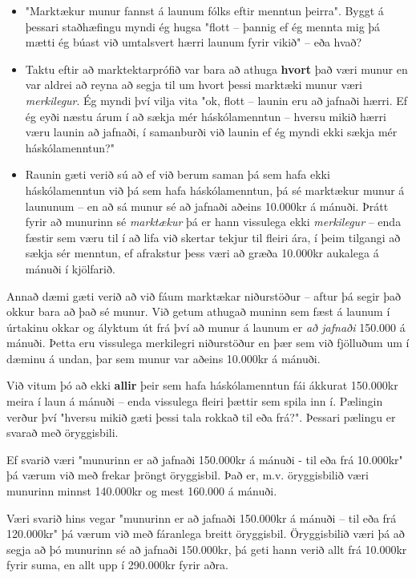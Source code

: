 \documentclass[
]{book}
\theoremstyle{definition}
\theoremstyle{definition}
\theoremstyle{definition}
\theoremstyle{definition}
\theoremstyle{remark}
\begin{document}
\begin{itemize}
\item
  "Marktækur munur fannst á launum fólks eftir menntun þeirra". Byggt á þessari staðhæfingu myndi ég hugsa "flott -- þannig ef ég mennta mig þá mætti ég búast við umtalsvert hærri launum fyrir vikið" -- eða hvað?
\item
  Taktu eftir að marktektarprófið var bara að athuga \textbf{hvort} það væri munur en var aldrei að reyna að segja til um hvort þessi marktæki munur væri \emph{merkilegur}. Ég myndi því vilja vita "ok, flott -- launin eru að jafnaði hærri. Ef ég eyði næstu árum í að sækja mér háskólamenntun -- hversu mikið hærri væru launin að jafnaði, í samanburði við launin ef ég myndi ekki sækja mér
  háskólamenntun?"
\item
  Raunin gæti verið sú að ef við berum saman þá sem hafa ekki háskólamenntun við þá sem hafa háskólamenntun, þá sé marktækur munur á laununum -- en að sá munur sé að jafnaði aðeins 10.000kr á mánuði. Þrátt fyrir að munurinn sé \emph{marktækur} þá er hann vissulega ekki \emph{merkilegur} -- enda fæstir sem væru til í að lifa við skertar tekjur til fleiri ára, í þeim tilgangi að sækja sér menntun, ef afrakstur þess væri að græða 10.000kr aukalega á mánuði í kjölfarið.
\end{itemize}

Annað dæmi gæti verið að við fáum marktækar niðurstöður -- aftur þá segir það okkur bara að það sé munur. Við getum athugað muninn sem fæst á launum í úrtakinu okkar og ályktum út frá því að munur á launum er \emph{að jafnaði} 150.000 á mánuði. Þetta eru vissulega merkilegri niðurstöður en þær
sem við fjölluðum um í dæminu á undan, þar sem munur var aðeins 10.000kr á mánuði.

Við vitum þó að ekki \textbf{allir} þeir sem hafa háskólamenntun fái ákkurat 150.000kr meira í laun á mánuði -- enda vissulega fleiri þættir sem spila inn í. Pælingin verður því "hversu mikið gæti þessi tala rokkað til eða frá?". Þessari pælingu er svarað með öryggisbili.

Ef svarið væri "munurinn er að jafnaði 150.000kr á mánuði - til eða frá 10.000kr" þá værum við með frekar þröngt öryggisbil. Það er, m.v. öryggisbilið væri munurinn minnst 140.000kr og mest 160.000 á mánuði.

Væri svarið hins vegar "munurinn er að jafnaði 150.000kr á mánuði -- til eða frá 120.000kr" þá værum við með fáranlega breitt öryggisbil. Öryggisbilið væri þá að segja að þó munurinn sé að jafnaði 150.000kr, þá geti hann verið allt frá 10.000kr fyrir suma, en allt upp í 290.000kr fyrir aðra.
\end{document}
